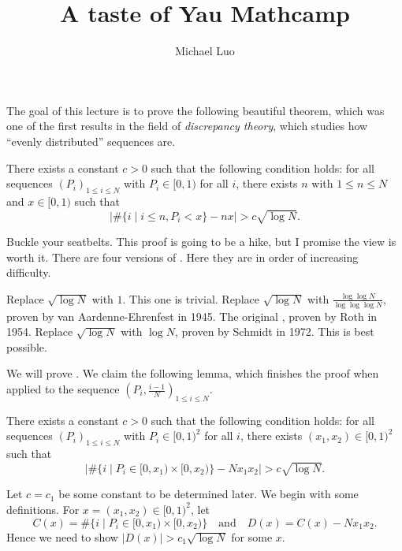 \documentclass[11pt]{scrartcl}
\author{Michael Luo}
\title{A taste of Yau Mathcamp}
\begin{document}
The goal of this lecture is to prove the following beautiful theorem, which was one of the first results in the field of \emph{discrepancy theory}, which studies how ``evenly distributed'' sequences are.

\begin{theorem}
    \label{thm:sqrt-log-N}
    There exists a constant $c > 0$ such that the following condition holds: for all sequences $(P_i)_{1 \le i \le N}$ with $P_i \in [0,1)$ for all $i$, there exists $n$ with $1 \le n \le N$ and $x \in [0,1)$ such that
    \[\lvert \#\{i \mid i \le n,P_i < x\} - nx\rvert > c\sqrt{\log N}.\]
\end{theorem}

Buckle your seatbelts. This proof is going to be a hike, but I promise the view is worth it. There are four versions of . Here they are in order of increasing difficulty.
\begin{itemize}
    \ii Replace $\sqrt{\log N}$ with $1$. This one is trivial.
    \ii Replace $\sqrt{\log N}$ with $\frac{\log\log N}{\log\log\log N}$, proven by van Aardenne-Ehrenfest in 1945.
    \ii The original , proven by Roth in 1954.
    \ii Replace $\sqrt{\log N}$ with $\log N$, proven by Schmidt in 1972. This is best possible.
\end{itemize}

We will prove . We claim the following lemma, which finishes the proof when applied to the sequence $(P_i,\frac{i - 1}N)_{1 \le i \le N}$.

\begin{lemma}
    There exists a constant $c > 0$ such that the following condition holds: for all sequences $(P_i)_{1 \le i \le N}$ with $P_i \in [0,1)^2$ for all $i$, there exists $(x_1,x_2) \in [0,1)^2$ such that
    \[\lvert \#\{i \mid P_i \in [0,x_1) \times [0,x_2)\} - Nx_1x_2\rvert > c\sqrt{\log N}.\]
\end{lemma}

Let $c = c_1$ be some constant to be determined later. We begin with some definitions. For $x = (x_1,x_2) \in [0,1)^2$, let
\[C(x) = \#\{i \mid P_i \in [0,x_1) \times [0,x_2)\} \quad \text{and} \quad D(x) = C(x) - Nx_1x_2.\]
Hence we need to show $\lvert D(x)\rvert > c_1\sqrt{\log N}$ for some $x$.
\end{document}
